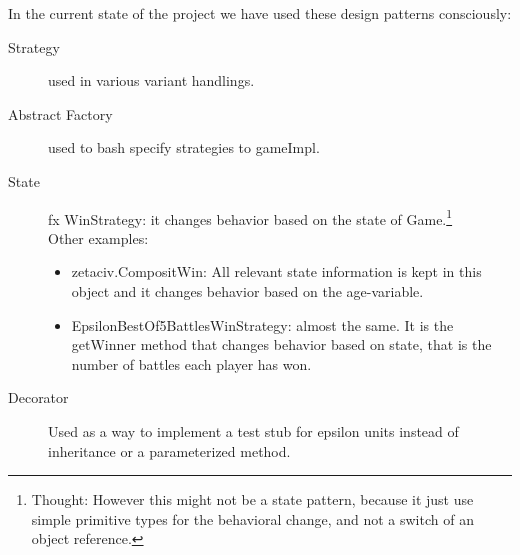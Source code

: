 In the current state of the project we have used these design patterns consciously:

\begin{description}
\item [Strategy] used in various variant handlings. 
\item [Abstract Factory]
            used to bash specify strategies to gameImpl.
\item [State]
        fx WinStrategy: it changes behavior based on the state of Game.\footnote{Thought: However this might not be a state pattern, because it just use simple primitive types for the behavioral change, and not a switch of an object reference.} \\
Other examples:
        \begin{itemize} \itemsep1pt \parskip0pt 
        \item zetaciv.CompositWin: All relevant state information is kept in this object and it changes behavior based on the age-variable.
        \item EpsilonBestOf5BattlesWinStrategy: almost the same. It is the getWinner method that changes behavior based on state, that is the number of battles each player has won.
        \end{itemize}
\item [Decorator]
    Used as a way to implement a test stub for epsilon units instead of inheritance or a parameterized method.
\end{description}

